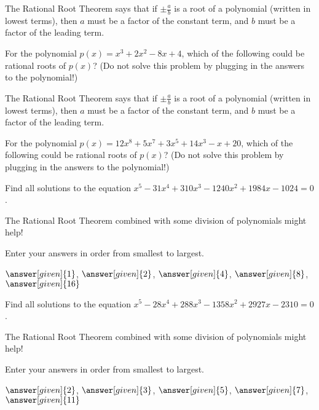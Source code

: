 \documentclass[nooutcomes]{ximera}
\begin{document}
\begin{problem}
The Rational Root Theorem says that if $\pm \frac{a}{b}$ is a root of a polynomial (written in lowest terms), then $a$ must be a factor of the constant term, and $b$ must be a factor of the leading term.

For the polynomial $p(x) = x^3 + 2x^2 - 8x + 4$, which of the following could be rational roots of $p(x)$?   (Do not solve this problem by plugging in the answers to the polynomial!)
\begin{selectAll}
\end{selectAll}
\end{problem}




\begin{problem}
The Rational Root Theorem says that if $\pm \frac{a}{b}$ is a root of a polynomial (written in lowest terms), then $a$ must be a factor of the constant term, and $b$ must be a factor of the leading term.

For the polynomial $p(x) = 12x^8 + 5x^7 + 3x^5 + 14x^3 - x + 20$, which of the following could be rational roots of $p(x)$?   (Do not solve this problem by plugging in the answers to the polynomial!)
\begin{selectAll}
\end{selectAll}
\end{problem}



\begin{problem}
Find all solutions to the equation $x^5-31x^4+310x^3-1240x^2+1984x-1024=0$. 
\begin{hint} 
The Rational Root Theorem combined with some division of polynomials might help!
\end{hint}
Enter your answers in order from smallest to largest.

\begin{prompt}
$\answer[given]{1}$, $\answer[given]{2}$, $\answer[given]{4}$, $\answer[given]{8}$, $\answer[given]{16}$
\end{prompt}
\end{problem}


\begin{problem}
Find all solutions to the equation $x^5-28x^4+288x^3-1358x^2+2927x-2310=0$. 
\begin{hint} 
The Rational Root Theorem combined with some division of polynomials might help!
\end{hint}
Enter your answers in order from smallest to largest.

\begin{prompt}
$\answer[given]{2}$, $\answer[given]{3}$, $\answer[given]{5}$, $\answer[given]{7}$, $\answer[given]{11}$
\end{prompt}
\end{problem}
\end{document}
